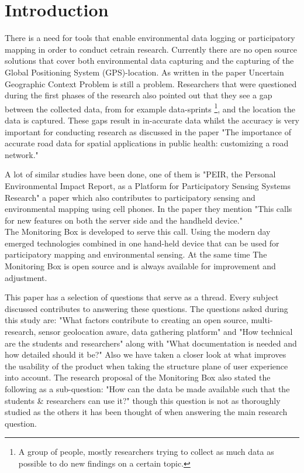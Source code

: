 \documentclass[conference]{IEEEtran}
\begin{document}
\IEEEpeerreviewmaketitle
\section{Introduction}
There is a need for tools that enable environmental data logging or participatory mapping in order to conduct cetrain research. Currently there are no open source solutions that cover both environmental data capturing and the capturing of the Global Positioning System (GPS)-location. As written in the paper Uncertain Geographic Context Problem \cite{kwan2012uncertain} is still a problem. Researchers that were questioned during the first phases of the research also pointed out that they see a gap  between the collected data, from for example data-sprints \footnote{A group of people, mostly researchers trying to collect as much data as possible to do new findings on a certain topic.}, and the location the data is captured. These gaps result in in-accurate data whilst the accuracy is very important for conducting research as discussed in the paper "The importance of accurate road data for spatial applications in public health: customizing a road network." \cite{frizzelle2009importance}

\par
A lot of similar studies have been done, one of them is "PEIR, the Personal Environmental Impact Report, as a Platform for Participatory Sensing Systems Research"
 \cite{mun2009peir} a paper which also contributes to participatory sensing and environmental mapping using cell phones. In the paper they mention "This calls for new
features on both the server side and the handheld device."  \cite{mun2009peir} \\
The Monitoring Box is developed to serve this call. Using the modern day emerged technologies combined in one hand-held device that can be used for participatory mapping and environmental sensing. At the same time The Monitoring Box is open source and is always available for improvement and adjustment.  

\par
This paper has a selection of questions that serve as a thread. Every subject discussed contributes to answering these questions. The questions asked during this study are: "What factors contribute to creating an open source, multi-research, sensor geolocation aware, data gathering platform"  \cite{monitoringBox2017researchproposal} and "How technical are the students and researchers" along with "What documentation is needed and how detailed should it be?" Also we have taken a closer look at what improves the usability of the product when taking the structure plane of user experience into account. \cite{monitoringBox2017researchproposal} The research proposal of the Monitoring Box also stated the following as a sub-question: "How can the data be made available such that the students \& researchers can use it?" \cite{monitoringBox2017researchproposal} though this question is not as thoroughly studied as the others it has been thought of when answering the main research question.  
\end{document}
